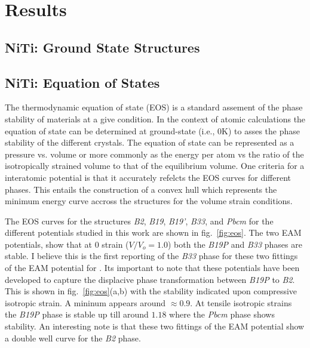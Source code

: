 \documentclass[preprint]{elsarticle}
\begin{document}
\section{Results}
\label{sec:results}

\subsection{NiTi: Ground State Structures}
\label{subsec:nitigs}



\subsection{NiTi: Equation of States}
\label{subsec:nitieos}
\cite{Luger2021}
The thermodynamic equation of state (EOS) is a standard assement of the phase stability of materials at a give condition. In the context of atomic calculations the equation of state can be determined at ground-state (i.e., 0K) to asses the phase stability of the different crystals. The equation of state can be represented as a pressure vs. volume or more commonly as the energy per atom  vs the ratio of the isotropically strained volume to that of the equilibrium volume. One criteria for a interatomic potential is that it accurately refelcts the EOS curves for different phases. This entails the construction of a convex hull which represents the minimum energy curve accross the structures for the volume strain conditions. \par

The EOS curves for the  structures \textit{B2}, \textit{B19}, \textit{B19'}, \textit{B33}, and \textit{Pbcm}  for the different potentials studied in this work are shown in fig.~\ref{fig:eos}. The two EAM potentials, show that at 0 strain ($V/V_o = 1.0$) both the \textit{B19P} and \textit{B33} phases are stable. I believe this is the first reporting of the \textit{B33} phase for these two fittings of the EAM potential for . Its important to note that these potentials have been developed to capture the displacive phase transformation between \textit{B19P} to \textit{B2}. This is shown in fig.~\ref{fig:eos}(a,b) with the stability indicated upon compressive isotropic strain. A mininum appears around $\approx 0.9$. At tensile isotropic strains the \textit{B19P} phase is stable up till around $1.18$ where the \textit{Pbcm} phase shows stability. An interesting note is that these two fittings of the EAM potential show a double well curve for the \textit{B2} phase. \par
\end{document}
